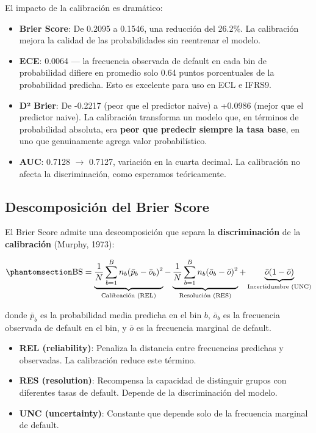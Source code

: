 \documentclass[
  spanish,
  11pt,
  letterpaper,
]{scrbook}
\providecommand{\tightlist}{%
  \setlength{\itemsep}{0pt}\setlength{\parskip}{0pt}}
\theoremstyle{plain}
\theoremstyle{remark}
\begin{document}
El impacto de la calibración es dramático:

\begin{itemize}
\tightlist
\item
  \textbf{Brier Score}: De 0.2095 a 0.1546, una reducción del 26.2\%. La
  calibración mejora la calidad de las probabilidades sin reentrenar el
  modelo.
\item
  \textbf{ECE}: 0.0064 --- la frecuencia observada de default en cada
  bin de probabilidad difiere en promedio solo 0.64 puntos porcentuales
  de la probabilidad predicha. Esto es excelente para uso en ECL e
  IFRS9.
\item
  \textbf{D² Brier}: De -0.2217 (peor que el predictor naive) a +0.0986
  (mejor que el predictor naive). La calibración transforma un modelo
  que, en términos de probabilidad absoluta, era \textbf{peor que
  predecir siempre la tasa base}, en uno que genuinamente agrega valor
  probabilístico.
\item
  \textbf{AUC}: 0.7128 \(\rightarrow\) 0.7127, variación en la cuarta
  decimal. La calibración no afecta la discriminación, como esperamos
  teóricamente.
\end{itemize}

\subsection{Descomposición del Brier
Score}\label{descomposiciuxf3n-del-brier-score}

El Brier Score admite una descomposición que separa la
\textbf{discriminación} de la \textbf{calibración} (Murphy, 1973):

\begin{equation}\protect\phantomsection\label{eq-brier-decomposition}{
\text{BS} = \underbrace{\frac{1}{N}\sum_{b=1}^{B} n_b (\bar{p}_b - \bar{o}_b)^2}_{\text{Calibración (REL)}} - \underbrace{\frac{1}{N}\sum_{b=1}^{B} n_b (\bar{o}_b - \bar{o})^2}_{\text{Resolución (RES)}} + \underbrace{\bar{o}(1 - \bar{o})}_{\text{Incertidumbre (UNC)}}
}\end{equation}

donde \(\bar{p}_b\) es la probabilidad media predicha en el bin \(b\),
\(\bar{o}_b\) es la frecuencia observada de default en el bin, y
\(\bar{o}\) es la frecuencia marginal de default.

\begin{itemize}
\tightlist
\item
  \textbf{REL (reliability)}: Penaliza la distancia entre frecuencias
  predichas y observadas. La calibración reduce este término.
\item
  \textbf{RES (resolution)}: Recompensa la capacidad de distinguir
  grupos con diferentes tasas de default. Depende de la discriminación
  del modelo.
\item
  \textbf{UNC (uncertainty)}: Constante que depende solo de la
  frecuencia marginal de default.
\end{itemize}
\end{document}
